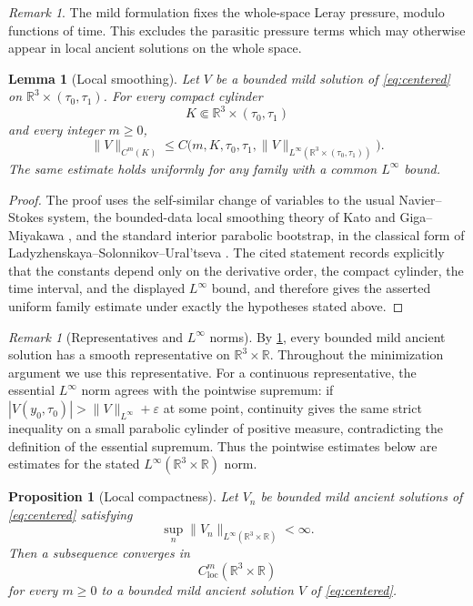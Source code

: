 \documentclass[11pt]{amsart}
\theoremstyle{plain}
\newtheorem{proposition}[theorem]{Proposition}
\newtheorem{lemma}[theorem]{Lemma}
\theoremstyle{definition}
\theoremstyle{remark}
\newtheorem{remark}[theorem]{Remark}
\numberwithin{equation}{section}
\begin{document}
\begin{remark}
The mild formulation fixes the whole-space Leray pressure, modulo functions of
time.  This excludes the parasitic pressure terms which may otherwise appear
in local ancient solutions on the whole space.
\end{remark}

\begin{lemma}[Local smoothing]\label{lem:smoothing}
Let \(V\) be a bounded mild solution of \eqref{eq:centered} on
\(\mathbb R^3\times(\tau_0,\tau_1)\).  For every compact cylinder
\[
   K\Subset \mathbb R^3\times(\tau_0,\tau_1)
\]
and every integer \(m\ge0\),
\[
   \|V\|_{C^m(K)}
   \le
   C\bigl(m,K,\tau_0,\tau_1,\|V\|_{L^\infty(\mathbb R^3\times(\tau_0,\tau_1))}\bigr).
\]
The same estimate holds uniformly for any family with a common
\(L^\infty\) bound.
\end{lemma}

\begin{proof}
The proof uses the self-similar change of variables to the usual Navier--Stokes
system, the bounded-data local smoothing theory of Kato \cite{Kato1984} and
Giga--Miyakawa
\cite{GigaMiyakawa1985}, and the standard interior parabolic bootstrap, in the
classical form of Ladyzhenskaya--Solonnikov--Ural'tseva \cite{LSU1968}.  The
cited statement records explicitly that the constants depend only on the
derivative order, the compact cylinder, the time interval, and the displayed
\(L^\infty\) bound, and therefore gives the asserted uniform family estimate
under exactly the hypotheses stated above.
\end{proof}

\begin{remark}[Representatives and \(L^\infty\) norms]\label{rem:representatives}
By \cref{lem:smoothing}, every bounded mild ancient solution has a smooth
representative on \(\mathbb R^3\times\mathbb R\).  Throughout the minimization
argument we use this representative.  For a continuous representative, the
essential \(L^\infty\) norm agrees with the pointwise supremum: if
\(|V(y_0,\tau_0)|>\|V\|_{L^\infty}+\varepsilon\) at some point, continuity
gives the same strict inequality on a small parabolic cylinder of positive
measure, contradicting the definition of the essential supremum.  Thus the
pointwise estimates below are estimates for the stated
\(L^\infty(\mathbb R^3\times\mathbb R)\) norm.
\end{remark}

\begin{proposition}[Local compactness]\label{prop:local-compactness}
Let \(V_n\) be bounded mild ancient solutions of \eqref{eq:centered} satisfying
\[
   \sup_n\|V_n\|_{L^\infty(\mathbb R^3\times\mathbb R)}<\infty .
\]
Then a subsequence converges in
\[
   C^m_{\mathrm{loc}}(\mathbb R^3\times\mathbb R)
\]
for every \(m\ge0\) to a bounded mild ancient solution \(V\) of
\eqref{eq:centered}.
\end{proposition}
\end{document}
